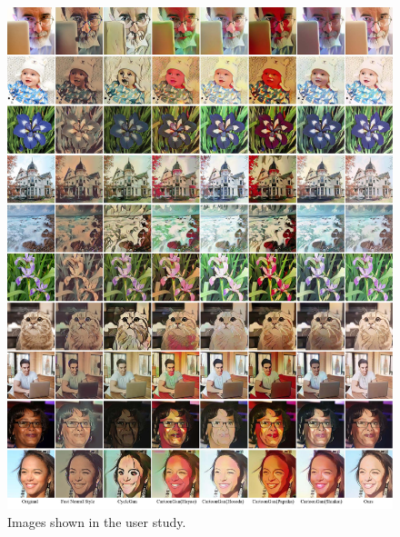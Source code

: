 \documentclass[10pt,twocolumn,letterpaper]{article}
\begin{document}
\begin{figure}[htb]
\vspace{-0.5em}
\centering
\includegraphics[width=\linewidth]{figures/userstudy1.pdf}
\caption{Images shown in the user study.}
\label{fig:userstudy1}
\end{figure}
\end{document}
